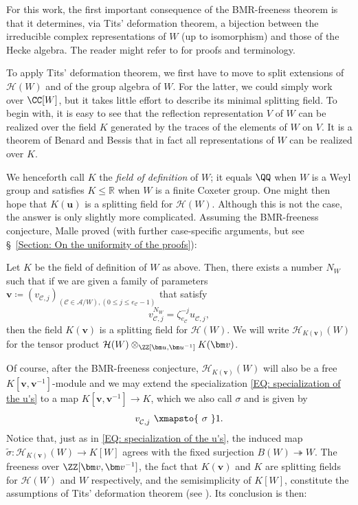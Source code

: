 For this work, the first important consequence of the BMR-freeness theorem is that it determines, via Tits' deformation theorem, a  bijection between the  irreducible complex representations of $W$ (up to isomorphism) and those of the Hecke algebra. The reader might refer to  \cite[\S~7]{geck-pfeiffer-book} for proofs and terminology. 

To apply Tits' deformation theorem, we first have to move to split extensions of $\mathcal{H}(W)$ and of the group algebra of $W$. For the latter, we could simply work over $\CC[W]$, but it takes little effort to describe its minimal splitting field. To begin with, it is easy to see \cite[Corol.~3.2]{bessis-corps-de-definition} that the reflection representation $V$ of $W$ can be realized over the field $K$ generated by the traces of the elements of $W$ on $V$. It is a theorem of Benard and Bessis \cite{benard-unitary,bessis-corps-de-definition} that in fact all representations of $W$ can be realized over $K$.

We henceforth call $K$ the {\it field of definition} of $W$; it equals $\QQ$ when $W$ is a Weyl group and satisfies $K\leq \mathbb{R}$ when $W$ is a finite Coxeter group. One might then hope that $K(\bm u)$ is a splitting field for $\mathcal{H}(W)$. Although this is not the case, the answer is only slightly more complicated. Assuming the BMR-freeness conjecture, Malle proved (with further case-specific arguments, but see \S~\ref{Section: On the uniformity of the proofs}):


\begin{prop}\label{Prop. Malle's charact. of splitting field L of H}
Let $K$ be the field of definition of $W$ as above. Then, there exists a number $N_W$ such that if we are given a family of parameters $\bm v\coloneqq (v_{\mathcal{C},j})_{(\mathcal{C}\in\mathcal{A}/W),(0\leq j\leq e_{\mathcal{C}}-1) }$ that satisfy $$
v_{\mathcal{C},j}^{N_W}=\zeta_{e_{\mathcal{C}}}^{-j}u^{\phantom{N_W}}_{\mathcal{C},j},$$ then the field $K(\bm v)$ is a splitting field for $\mathcal{H}(W)$. We will write  $\mathcal{H}_{K(\bm v)}(W)$ for the tensor product $\mathcal{H}(W)\otimes_{\ZZ[\bm u,\bm u^{-1}]}K(\bm v)$.
\end{prop}

Of course, after the BMR-freeness conjecture, $\mathcal{H}_{K(\bm v)}(W)$ will also be a free $K[\bm v, \bm v^{-1}]$-module and we may extend the specialization \eqref{EQ: specialization of the u's} to a map $K[\bm v, \bm v^{-1}]\rightarrow K$, which we also call $\sigma$ and is given by\begin{equation}
v^{\phantom{N_W}}_{\mathcal{C},j}\xmapsto{\displaystyle \ \sigma\ } 1. \label{EQ: Specialization v-> 1}
\end{equation} Notice that, just as in \eqref{EQ: specialization of the u's}, the induced map $\tilde{\sigma}:\mathcal{H}_{K(\bm v)}(W)\rightarrow K[W]$ agrees with the fixed surjection $B(W)\twoheadrightarrow W$. The freeness over $\ZZ[\bm v, \bm v^{-1}]$, the fact that $K(\bm v)$ and $K$ are splitting fields for $\mathcal{H}(W)$ and $W$ respectively, and the semisimplicity of $K[W]$, constitute the assumptions of Tits' deformation theorem (see \cite[\S7.3-4]{geck-pfeiffer-book}). Its conclusion is then:


